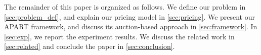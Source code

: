 The remainder of this paper is organized as follows. We define our problem in \cref{sec:problem_def}, and explain our pricing model in \cref{sec:pricing}. We present our APART framework, and discuss its auction-based approach in \cref{sec:framework}. In \cref{sec:exp}, we report the experiment results. We discuss the related work in \cref{sec:related} and conclude the paper in \cref{sec:conclusion}.










